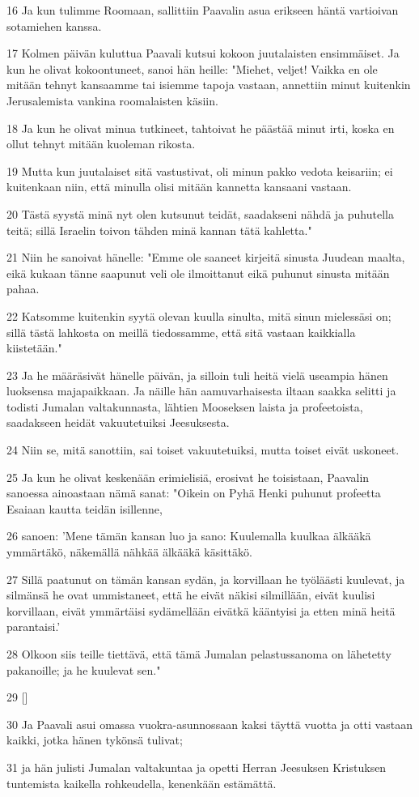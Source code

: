 \par 16 Ja kun tulimme Roomaan, sallittiin Paavalin asua erikseen häntä vartioivan sotamiehen kanssa.
\par 17 Kolmen päivän kuluttua Paavali kutsui kokoon juutalaisten ensimmäiset. Ja kun he olivat kokoontuneet, sanoi hän heille: "Miehet, veljet! Vaikka en ole mitään tehnyt kansaamme tai isiemme tapoja vastaan, annettiin minut kuitenkin Jerusalemista vankina roomalaisten käsiin.
\par 18 Ja kun he olivat minua tutkineet, tahtoivat he päästää minut irti, koska en ollut tehnyt mitään kuoleman rikosta.
\par 19 Mutta kun juutalaiset sitä vastustivat, oli minun pakko vedota keisariin; ei kuitenkaan niin, että minulla olisi mitään kannetta kansaani vastaan.
\par 20 Tästä syystä minä nyt olen kutsunut teidät, saadakseni nähdä ja puhutella teitä; sillä Israelin toivon tähden minä kannan tätä kahletta."
\par 21 Niin he sanoivat hänelle: "Emme ole saaneet kirjeitä sinusta Juudean maalta, eikä kukaan tänne saapunut veli ole ilmoittanut eikä puhunut sinusta mitään pahaa.
\par 22 Katsomme kuitenkin syytä olevan kuulla sinulta, mitä sinun mielessäsi on; sillä tästä lahkosta on meillä tiedossamme, että sitä vastaan kaikkialla kiistetään."
\par 23 Ja he määräsivät hänelle päivän, ja silloin tuli heitä vielä useampia hänen luoksensa majapaikkaan. Ja näille hän aamuvarhaisesta iltaan saakka selitti ja todisti Jumalan valtakunnasta, lähtien Mooseksen laista ja profeetoista, saadakseen heidät vakuutetuiksi Jeesuksesta.
\par 24 Niin se, mitä sanottiin, sai toiset vakuutetuiksi, mutta toiset eivät uskoneet.
\par 25 Ja kun he olivat keskenään erimielisiä, erosivat he toisistaan, Paavalin sanoessa ainoastaan nämä sanat: "Oikein on Pyhä Henki puhunut profeetta Esaiaan kautta teidän isillenne,
\par 26 sanoen: 'Mene tämän kansan luo ja sano: Kuulemalla kuulkaa älkääkä ymmärtäkö, näkemällä nähkää älkääkä käsittäkö.
\par 27 Sillä paatunut on tämän kansan sydän, ja korvillaan he työläästi kuulevat, ja silmänsä he ovat ummistaneet, että he eivät näkisi silmillään, eivät kuulisi korvillaan, eivät ymmärtäisi sydämellään eivätkä kääntyisi ja etten minä heitä parantaisi.'
\par 28 Olkoon siis teille tiettävä, että tämä Jumalan pelastussanoma on lähetetty pakanoille; ja he kuulevat sen."
\par 29 []
\par 30 Ja Paavali asui omassa vuokra-asunnossaan kaksi täyttä vuotta ja otti vastaan kaikki, jotka hänen tykönsä tulivat;
\par 31 ja hän julisti Jumalan valtakuntaa ja opetti Herran Jeesuksen Kristuksen tuntemista kaikella rohkeudella, kenenkään estämättä.


